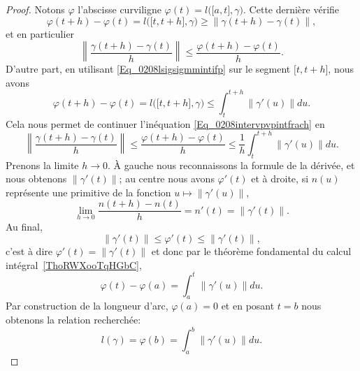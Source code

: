 \begin{proof}
    Notons $\varphi$ l'abscisse curviligne $\varphi(t)=l\big( \mathopen[ a , t \mathclose],\gamma \big)$. Cette dernière vérifie
    \begin{equation}
        \varphi(t+h)-\varphi(t)=l\big( \mathopen[ t , t+h \mathclose],\gamma \big)\geq \| \gamma(t+h)-\gamma(t) \|,
    \end{equation}
    et en particulier
    \begin{equation}     \label{Eq_0208intervpvpintfrach}
        \left\| \frac{ \gamma(t+h)-\gamma(t) }{ h } \right\|\leq \frac{ \varphi(t+h)-\varphi(t) }{ h }.
    \end{equation}
    D'autre part, en utilisant \eqref{Eq_0208lsigsigmmintifp} sur le segment $\mathopen[ t , t+h \mathclose]$, nous avons
    \begin{equation}
        \varphi(t+h)-\varphi(t)=l\big( \mathopen[ t , t+h \mathclose],\gamma \big)\leq\int_{t}^{t+h}\| \gamma'(u) \|du.
    \end{equation}
    Cela nous permet de continuer l'inéquation \eqref{Eq_0208intervpvpintfrach} en
    \begin{equation}
        \left\| \frac{ \gamma(t+h)-\gamma(t) }{ h } \right\|\leq\frac{ \varphi(t+h)-\varphi(t) }{ h }\leq\frac{1}{ h }\int_t^{t+h}\| \gamma'(u) \|du.
    \end{equation}
    Prenons la limite $h\to 0$. À gauche nous reconnaissons la formule de la dérivée, et nous obtenons $\| \gamma'(t) \|$; au centre nous avons $\varphi'(t)$ et à droite, si $n(u)$ représente une primitive de la fonction $u\mapsto\| \gamma'(u) \|$,
    \begin{equation}
        \lim_{h\to 0}\frac{ n(t+h)-n(t) }{ h }=n'(t)=\| \gamma'(t) \|.
    \end{equation}
    Au final,
    \begin{equation}
        \| \gamma'(t) \|\leq \varphi'(t)\leq\| \gamma'(t) \|,
    \end{equation}
    c'est à dire $\varphi'(t)=\| \gamma'(t) \|$ et donc par le théorème fondamental du calcul intégral~\ref{ThoRWXooTqHGbC},
    \begin{equation}
        \varphi(t)-\varphi(a)=\int_a^t\| \gamma'(u) \|du.
    \end{equation}
    Par construction de la longueur d'arc, $\varphi(a)=0$ et en posant $t=b$ nous obtenons la relation recherchée:
    \begin{equation}
        l(\gamma)=\varphi(b)=\int_a^b\| \gamma'(u) \|du.
    \end{equation}
\end{proof}

